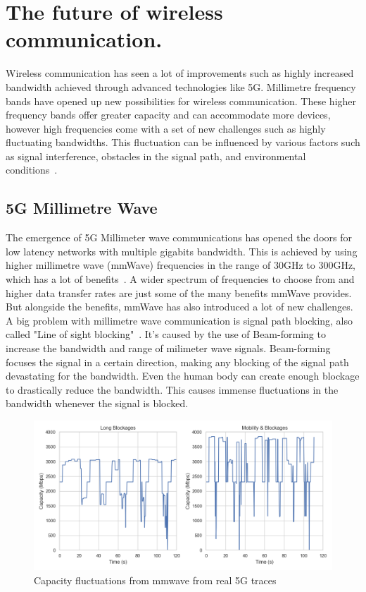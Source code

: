 \documentclass[a4paper,english, 11pt]{report}
\begin{document}
\section{The future of wireless communication.}
Wireless communication has seen a lot of improvements such as highly increased bandwidth achieved through advanced technologies like 5G. Millimetre frequency bands have opened up new possibilities for wireless communication. These higher frequency bands offer greater capacity and can accommodate more devices, however high frequencies come with a set of new challenges such as highly fluctuating bandwidths. This fluctuation can be influenced by various factors such as signal interference, obstacles in the signal path, and environmental conditions~\cite{4623710}.

\subsection{5G Millimetre Wave}
The emergence of 5G Millimeter wave communications has opened the doors for low latency networks with multiple gigabits bandwidth. This is achieved by using higher millimetre wave (mmWave) frequencies in the range of 30GHz to 300GHz, which has a lot of benefits~\cite{Agrawal_Sharma_2016}. A wider spectrum of frequencies to choose from and higher data transfer rates are just some of the many benefits mmWave provides. But alongside the benefits, mmWave has also introduced a lot of new challenges.\\

A big problem with millimetre wave communication is signal path blocking, also called "Line of sight blocking"~\cite{mmwave_blocking}. It's caused by the use of Beam-forming to increase the bandwidth and range of milimeter wave signals. Beam-forming focuses the signal in a certain direction, making any blocking of the signal path devastating for the bandwidth. Even the human body can create enough blockage to drastically reduce the bandwidth. This causes immense fluctuations in the bandwidth whenever the signal is blocked.\\

\begin{figure}[h!] %
	\centering
	\includegraphics[scale=0.33]{../diagrams/witestlab/lb_mobb.png}
  	\caption{Capacity fluctuations from mmwave from real 5G traces~\cite{Srivastava_Fund_Panwar_2020}}
  	\label{fig:blockage}
\end{figure}
\end{document}
